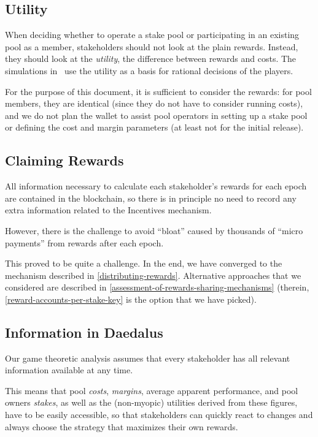 \documentclass[11pt,a4paper,dvipsnames,twosided]{article}
\begin{document}
\subsection{Utility}
\label{utility}

When deciding whether to operate a stake pool or participating in an existing
pool as a member, stakeholders should not look at the plain rewards. Instead,
they should look at the \emph{utility}, the difference between rewards and
costs. The simulations in~\citep{bkks2018} use the utility as a basis for
rational decisions of the players.

For the purpose of this document, it is sufficient to consider the rewards: for
pool members, they are identical (since they do not have to consider running
costs), and we do not plan the wallet to assist pool operators in setting up a
stake pool or defining the cost and margin parameters (at least not for the
initial release).

\subsection{Claiming Rewards}
\label{claiming-rewards}

All information necessary to calculate each stakeholder's rewards for
each epoch are contained in the blockchain, so there is in principle no
need to record any extra information related to the Incentives
mechanism.

However, there is the challenge to avoid ``bloat'' caused by thousands
of ``micro payments'' from rewards after each epoch.

This proved to be quite a challenge. In the end, we have converged to the
mechanism described in \cref{distributing-rewards}. Alternative approaches that
we considered are described in \cref{assessment-of-rewards-sharing-mechanisms}
(therein, \cref{reward-accounts-per-stake-key} is the option that we have
picked).

\subsection{Information in Daedalus}
\label{information-in-daedalus}

Our game theoretic analysis assumes that every stakeholder has all
relevant information available at any time.

This means that pool \emph{costs}, \emph{margins}, average apparent performance,
and pool owners \emph{stakes}, as well as the (non-myopic) utilities derived
from these figures, have to be easily accessible, so that stakeholders can
quickly react to changes and always choose the strategy that maximizes their own
rewards.
\end{document}
